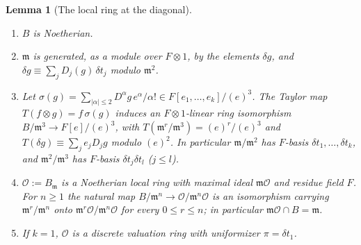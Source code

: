 \documentclass[11pt]{amsart}
\theoremstyle{plain}
\newtheorem{lemma}[theorem]{Lemma}
\theoremstyle{definition}
\begin{document}
\begin{lemma}[The local ring at the diagonal]\label{lem:local}
\begin{enumerate}
\item[(a)] $B$ is Noetherian.
\item[(b)] $\mathfrak m$ is generated, as a module over $F\otimes1$, by the elements $\delta g$, and
$\delta g\equiv\sum_jD_j(g)\,\delta t_j$ modulo $\mathfrak m^2$.
\item[(c)] Let $\sigma(g)=\sum_{|\alpha|\le2}D^\alpha g\,e^\alpha/\alpha!\in F[e_1,\dots,e_k]/(e)^3$. The Taylor
map $T(f\otimes g)=f\,\sigma(g)$ induces an $F\otimes1$-linear ring isomorphism
$B/\mathfrak m^3\to F[e]/(e)^3$, with $T(\mathfrak m^r/\mathfrak m^3)=(e)^r/(e)^3$ and
$T(\delta g)\equiv\sum_je_jD_jg$ modulo $(e)^2$. In particular $\mathfrak m/\mathfrak m^2$ has $F$-basis
$\delta t_1,\dots,\delta t_k$, and $\mathfrak m^2/\mathfrak m^3$ has $F$-basis $\delta t_j\delta t_l$
($j\le l$).
\item[(d)] $\mathcal O:=B_{\mathfrak m}$ is a Noetherian local ring with maximal ideal $\mathfrak m\mathcal O$
and residue field $F$. For $n\ge1$ the natural map $B/\mathfrak m^n\to\mathcal O/\mathfrak m^n\mathcal O$ is
an isomorphism carrying $\mathfrak m^r/\mathfrak m^n$ onto $\mathfrak m^r\mathcal O/\mathfrak m^n\mathcal O$
for every $0\le r\le n$; in particular $\mathfrak m\mathcal O\cap B=\mathfrak m$.
\item[(e)] If $k=1$, $\mathcal O$ is a discrete valuation ring with uniformizer $\pi=\delta t_1$.
\end{enumerate}
\end{lemma}
\end{document}
